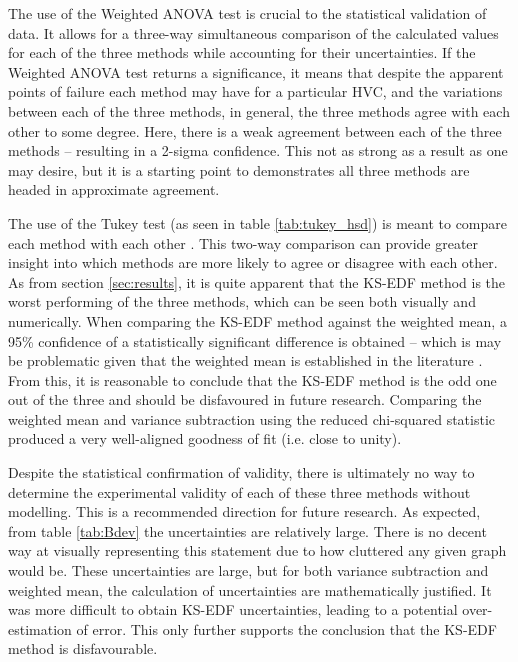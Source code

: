 The use of the Weighted ANOVA test is crucial to the statistical validation of data. It allows for a three-way simultaneous comparison of the calculated values for each of the three methods while accounting for their uncertainties. If the Weighted ANOVA test returns a significance, it means that despite the apparent points of failure each method may have for a particular HVC, and the variations between each of the three methods, in general, the three methods agree with each other to some degree. Here, there is a weak agreement between each of the three methods – resulting in a 2-sigma confidence. This not as strong as a result as one may desire, but it is a starting point to demonstrates all three methods are headed in approximate agreement.


The use of the Tukey test (as seen in table \ref{tab:tukey_hsd}) is meant to compare each method with each other \citep{ID77, ID78}. This two-way comparison can provide greater insight into which methods are more likely to agree or disagree with each other. As from section \ref{sec:results}, it is quite apparent that the KS-EDF method is the worst performing of the three methods, which can be seen both visually and numerically. When comparing the KS-EDF method against the weighted mean, a 95\% confidence of a statistically significant difference is obtained – which is may be problematic given that the weighted mean is established in the literature \citep{ID5, ID26}. From this, it is reasonable to conclude that the KS-EDF method is the odd one out of the three and should be disfavoured in future research. Comparing the weighted mean and variance subtraction using the reduced chi-squared statistic produced a very well-aligned goodness of fit (i.e. close to unity).


Despite the statistical confirmation of validity, there is ultimately no way to determine the experimental validity of each of these three methods without modelling. This is a recommended direction for future research. As expected, from table \ref{tab:Bdev} the uncertainties are relatively large. There is no decent way at visually representing this statement due to how cluttered any given graph would be. These uncertainties are large, but for both variance subtraction and weighted mean, the calculation of uncertainties are mathematically justified. It was more difficult to obtain KS-EDF uncertainties, leading to a potential over-estimation of error. This only further supports the conclusion that the KS-EDF method is disfavourable.


